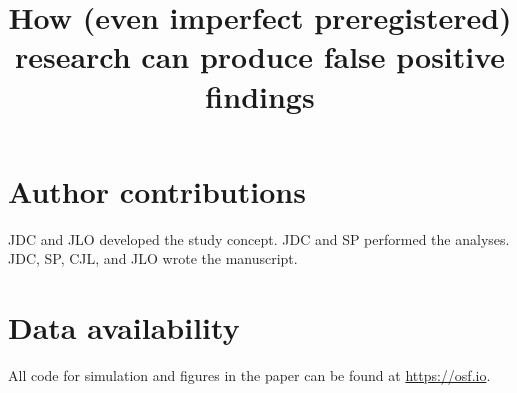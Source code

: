 \documentclass[english,natbib,man,floatsintext]{apa6}
\title{How (even imperfect preregistered) research can produce false positive findings}
\begin{document}
\maketitle









\section{Author contributions}
JDC and JLO developed the study concept. JDC and SP performed the analyses. JDC, SP, CJL, and JLO wrote the manuscript. 

\section{Data availability}
All code for simulation and figures in the paper can be found at \url{https://osf.io}.



\clearpage

 
\end{document}

